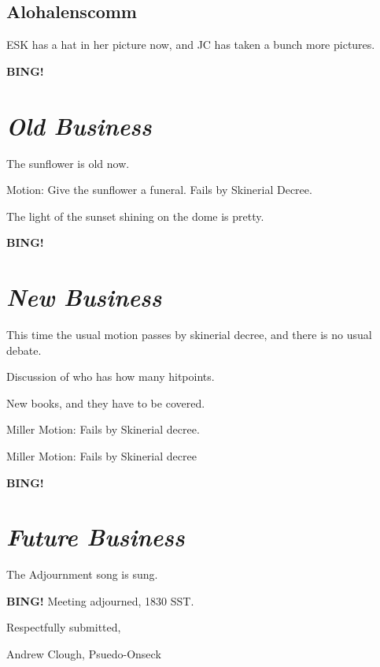 \documentclass[10pt]{article}
\newcommand{\bing}{{\bf BING!} }
\newcommand{\goto}[1]{\bing \vskip 12pt \section*{{\em{#1}}}}
\begin{document}
\subsection*{Alohalenscomm}

ESK has a hat in her picture now, and JC has taken a bunch more pictures.





\goto{Old Business}

The sunflower is old now.

Motion:  Give the sunflower a funeral.  Fails by Skinerial Decree.

The light of the sunset shining on the dome is pretty.

\goto{New Business}
This time the usual motion passes by skinerial decree, and there is no usual debate.

Discussion of who has how many hitpoints.

New books, and they have to be covered.

Miller Motion:  Fails by Skinerial decree.

Miller Motion:  Fails by Skinerial decree

\goto{Future Business}

The Adjournment song is sung.

\bing
\noindent
Meeting adjourned, 1830 SST.

\vspace{18pt}

\centerline{Respectfully submitted,}
\centerline{Andrew Clough, Psuedo-Onseck}
\end{document}
